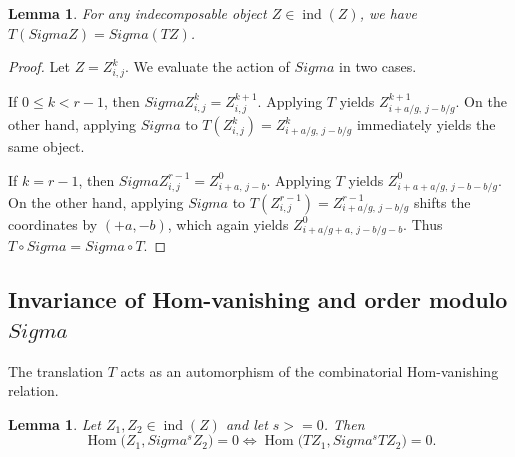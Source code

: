\documentclass[11pt, a4paper]{article}
\newtheorem{lemma}[theorem]{Lemma}
\theoremstyle{definition}
\def\Sigma{Sigma}%
\def\ge{>=}%
\def\mathcal#1{#1}%
\begin{document}
\begin{lemma}\label{lem:T-Sigma-commute}
For any indecomposable object $Z \in \operatorname{ind}(\mathcal Z)$, we have $T(\Sigma Z) = \Sigma(T Z)$.
\end{lemma}

\begin{proof}
Let $Z = Z_{i,j}^k$. We evaluate the action of $\Sigma$ in two cases.

If $0 \le k < r-1$, then $\Sigma Z_{i,j}^k = Z_{i,j}^{k+1}$. Applying $T$ yields $Z_{i+a/g,\, j-b/g}^{k+1}$. On the other hand, applying $\Sigma$ to $T(Z_{i,j}^k) = Z_{i+a/g,\, j-b/g}^k$ immediately yields the same object.

If $k = r-1$, then $\Sigma Z_{i,j}^{r-1} = Z_{i+a,\, j-b}^0$. Applying $T$ yields $Z_{i+a+a/g,\, j-b-b/g}^0$. On the other hand, applying $\Sigma$ to $T(Z_{i,j}^{r-1}) = Z_{i+a/g,\, j-b/g}^{r-1}$ shifts the coordinates by $(+a, -b)$, which again yields $Z_{i+a/g+a,\, j-b/g-b}^0$. Thus $T \circ \Sigma = \Sigma \circ T$.
\end{proof}

\subsection{Invariance of Hom-vanishing and order modulo \texorpdfstring{$\Sigma$}{Sigma}}\label{subsec:Taction-hom}

The translation $T$ acts as an automorphism of the combinatorial Hom-vanishing relation.

\begin{lemma}\label{lem:T-preserves}
Let $Z_1, Z_2 \in \operatorname{ind}(\mathcal Z)$ and let $s \ge 0$. Then
\[
  \operatorname{Hom}\bigl(Z_1, \Sigma^s Z_2\bigr) = 0
  \iff
  \operatorname{Hom}\bigl(T Z_1, \Sigma^s T Z_2\bigr) = 0.
\]
\end{lemma}
\end{document}
